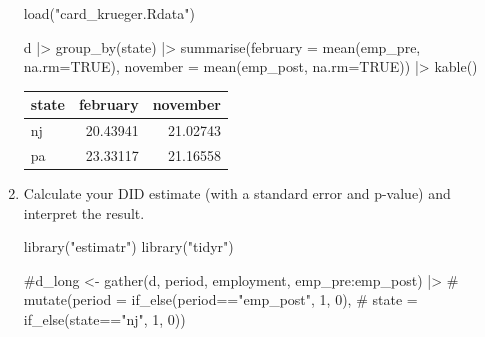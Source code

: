 \documentclass[
  12pt,
  letterpaper,
  DIV=11,
  numbers=noendperiod]{scrartcl}
\newenvironment{Shaded}{\begin{snugshade}}{\end{snugshade}}
\newcommand{\AttributeTok}[1]{\textcolor[rgb]{0.40,0.45,0.13}{#1}}
\newcommand{\CommentTok}[1]{\textcolor[rgb]{0.37,0.37,0.37}{#1}}
\newcommand{\ConstantTok}[1]{\textcolor[rgb]{0.56,0.35,0.01}{#1}}
\newcommand{\FunctionTok}[1]{\textcolor[rgb]{0.28,0.35,0.67}{#1}}
\newcommand{\NormalTok}[1]{\textcolor[rgb]{0.00,0.23,0.31}{#1}}
\newcommand{\SpecialCharTok}[1]{\textcolor[rgb]{0.37,0.37,0.37}{#1}}
\newcommand{\StringTok}[1]{\textcolor[rgb]{0.13,0.47,0.30}{#1}}
\newcommand{\1}[1]{\mathds{1}\left[#1\right]}
\begin{document}
\begin{enumerate}
\begin{Shaded}
\begin{Highlighting}[]
\FunctionTok{load}\NormalTok{(}\StringTok{"card\_krueger.Rdata"}\NormalTok{)}

\NormalTok{d }\SpecialCharTok{|\textgreater{}}  \FunctionTok{group\_by}\NormalTok{(state) }\SpecialCharTok{|\textgreater{}} 
  \FunctionTok{summarise}\NormalTok{(}\AttributeTok{february =} \FunctionTok{mean}\NormalTok{(emp\_pre, }\AttributeTok{na.rm=}\ConstantTok{TRUE}\NormalTok{),}
            \AttributeTok{november =} \FunctionTok{mean}\NormalTok{(emp\_post, }\AttributeTok{na.rm=}\ConstantTok{TRUE}\NormalTok{)) }\SpecialCharTok{|\textgreater{}} \FunctionTok{kable}\NormalTok{()}
\end{Highlighting}
\end{Shaded}

\begin{longtable}[]{@{}lrr@{}}
\toprule\noalign{}
state & february & november \\
\midrule\noalign{}
\endhead
\bottomrule\noalign{}
\endlastfoot
nj & 20.43941 & 21.02743 \\
pa & 23.33117 & 21.16558 \\
\end{longtable}

\item

Calculate your DID estimate (with a standard error and p-value) and
interpret the result.

\begin{Shaded}
\begin{Highlighting}[]
\FunctionTok{library}\NormalTok{(}\StringTok{"estimatr"}\NormalTok{)}
\FunctionTok{library}\NormalTok{(}\StringTok{"tidyr"}\NormalTok{)}

\CommentTok{\#d\_long \textless{}{-} gather(d, period, employment, emp\_pre:emp\_post) |\textgreater{}}
\CommentTok{\#  mutate(period = if\_else(period=="emp\_post", 1, 0),}
\CommentTok{\#         state = if\_else(state=="nj", 1, 0))}


\end{Highlighting}
\end{Shaded}
\end{enumerate}
\end{document}
